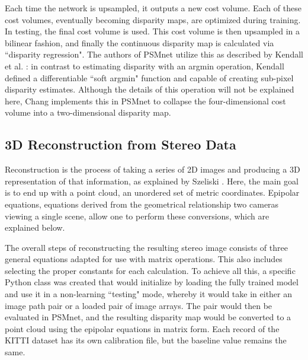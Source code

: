 Each time the network is upsampled, it outputs a new cost volume. Each of these cost volumes, eventually becoming disparity maps, are optimized during training. In testing, the final cost volume is used. This cost volume is then upsampled in a bilinear fashion, and finally the continuous disparity map is calculated via ``disparity regression". The authors of PSMnet utilize this as described by Kendall et al. \cite{kendall_end--end_2017}: in contrast to estimating disparity with an argmin operation, Kendall defined a differentiable ``soft argmin" function and capable of creating sub-pixel disparity estimates. Although the details of this operation will not be explained here, Chang implements this in PSMnet to collapse the four-dimensional cost volume into a two-dimensional disparity map. 

\subsection{3D Reconstruction from Stereo Data}
\label{sect_reconstruct}
Reconstruction is the process of taking a series of 2D images and producing a 3D representation of that information, as explained by Szeliski \cite{szeliski_computer_2010}. Here, the main goal is to end up with a point cloud, an unordered set of metric coordinates. Epipolar equations, equations derived from the geometrical relationship two cameras viewing a single scene, allow one to perform these conversions, which are explained below.

The overall steps of reconstructing the resulting stereo image consists of three general equations adapted for use with matrix operations\cite{szeliski_computer_2010, wang_pseudo-lidar_2019}. This also includes selecting the proper constants for each calculation. To achieve all this, a specific Python class was created that would initialize by loading the fully trained model and use it in a non-learning ``testing" mode, whereby it would take in either an image path pair or a loaded pair of image arrays. The pair would then be evaluated in PSMnet, and the resulting disparity map would be converted to a point cloud using the epipolar equations in matrix form. Each record of the KITTI dataset has its own calibration file, but the baseline value remains the same.

